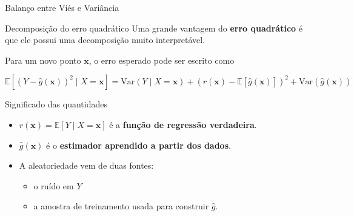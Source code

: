 \documentclass[
  ignorenonframetext,
  aspectratio=169,
]{beamer}
\providecommand{\tightlist}{%
  \setlength{\itemsep}{0pt}\setlength{\parskip}{0pt}}
\begin{document}
\begin{frame}{Balanço entre Viés e Variância}
\label{balanuxe7o-entre-viuxe9s-e-variuxe2ncia}
\begin{block}{Decomposição do erro quadrático}
\label{decomposiuxe7uxe3o-do-erro-quadruxe1tico}
Uma grande vantagem do \textbf{erro quadrático} é que ele possui uma
decomposição muito interpretável.

Para um novo ponto \(\mathbf{x}\), o erro esperado pode ser escrito como

\[
\mathbb{E}\left[(Y - \hat g(\mathbf{x}))^2 \mid X = \mathbf{x}\right]
=
\mathrm{Var}(Y \mid X = \mathbf{x})
+
\left(r(\mathbf{x}) - \mathbb{E}[\hat g(\mathbf{x})]\right)^2
+
\mathrm{Var}(\hat g(\mathbf{x}))
\]
\end{block}
\end{frame}

\begin{frame}
\begin{block}{Significado das quantidades}
\label{significado-das-quantidades}
\begin{itemize}
\item
  \(r(\mathbf{x}) = \mathbb{E}[Y \mid X = \mathbf{x}]\) é a
  \textbf{função de regressão verdadeira}.
\item
  \(\hat g(\mathbf{x})\) é o \textbf{estimador aprendido a partir dos
  dados}.
\item
  A aleatoriedade vem de duas fontes:

  \begin{itemize}
  \tightlist
  \item
    o ruído em \(Y\)
  \item
    a amostra de treinamento usada para construir \(\hat g\).
  \end{itemize}
\end{itemize}
\end{block}
\end{frame}
\end{document}

